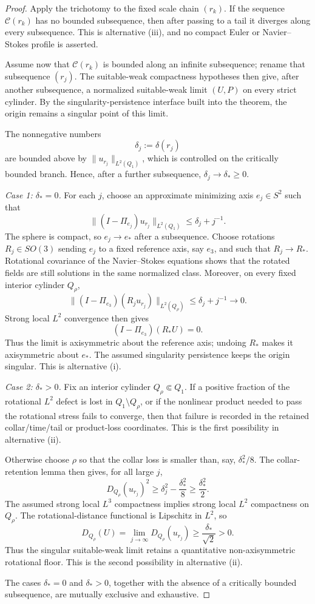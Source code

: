 \documentclass[11pt]{article}
\theoremstyle{definition}\newtheorem{problem}[theorem]{Problem}
\theoremstyle{definition}
\theoremstyle{remark}
\begin{document}
\begin{proof}
Apply the trichotomy to the fixed scale chain \((r_k)\).  If the sequence
\(\mathcal C(r_k)\) has no bounded subsequence, then after passing to a tail it
diverges along every subsequence.  This is alternative (iii), and no compact
Euler or Navier--Stokes profile is asserted.

Assume now that \(\mathcal C(r_k)\) is bounded along an infinite subsequence;
rename that subsequence \((r_j)\).  The suitable-weak compactness hypotheses
then give, after another subsequence, a normalized suitable-weak limit
\((U,P)\) on every strict cylinder.  By the singularity-persistence interface
built into the theorem, the origin remains a singular point of this limit.

The nonnegative numbers
\[
 \delta_j:=\delta(r_j)
\]
are bounded above by \(\|u_{r_j}\|_{L^2(Q_1)}\), which is controlled on the
critically bounded branch.  Hence, after a further subsequence,
\(\delta_j\to\delta_*\ge0\).

\emph{Case 1: \(\delta_*=0\).}
For each \(j\), choose an approximate minimizing axis \(e_j\in S^2\) such that
\[
 \|(I-\Pi_{e_j})u_{r_j}\|_{L^2(Q_1)}
 \le \delta_j+j^{-1}.
\]
The sphere is compact, so \(e_j\to e_*\) after a subsequence.  Choose rotations
\(R_j\in SO(3)\) sending \(e_j\) to a fixed reference axis, say \(e_3\), and
such that \(R_j\to R_*\).  Rotational covariance of the Navier--Stokes
equations shows that the rotated fields are still solutions in the same
normalized class.  Moreover, on every fixed interior cylinder \(Q_\rho\),
\[
 \|(I-\Pi_{e_3})(R_ju_{r_j})\|_{L^2(Q_\rho)}
 \le \delta_j+j^{-1}\to0.
\]
Strong local \(L^2\) convergence then gives
\[
 (I-\Pi_{e_3})(R_*U)=0.
\]
Thus the limit is axisymmetric about the reference axis; undoing \(R_*\) makes
it axisymmetric about \(e_*\).  The assumed singularity persistence keeps the
origin singular.  This is alternative (i).

\emph{Case 2: \(\delta_*>0\).}
Fix an interior cylinder \(Q_\rho\Subset Q_1\).  If a positive fraction of the
rotational \(L^2\) defect is lost in \(Q_1\setminus Q_\rho\), or if the
nonlinear product needed to pass the rotational stress fails to converge,
then that failure is recorded in the retained collar/time/tail or product-loss
coordinates.  This is the first possibility in alternative (ii).

Otherwise choose \(\rho\) so that the collar loss is smaller than, say,
\(\delta_*^2/8\).  The collar-retention lemma then gives, for all large \(j\),
\[
 D_{Q_\rho}(u_{r_j})^2
 \ge \delta_j^2-\frac{\delta_*^2}{8}
 \ge \frac{\delta_*^2}{2}.
\]
The assumed strong local \(L^3\) compactness implies strong local \(L^2\)
compactness on \(Q_\rho\).  The rotational-distance functional is Lipschitz in
\(L^2\), so
\[
 D_{Q_\rho}(U)
 =\lim_{j\to\infty}D_{Q_\rho}(u_{r_j})
 \ge \frac{\delta_*}{\sqrt2}>0.
\]
Thus the singular suitable-weak limit retains a quantitative
non-axisymmetric rotational floor.  This is the second possibility in
alternative (ii).

The cases \(\delta_*=0\) and \(\delta_*>0\), together with the absence of a
critically bounded subsequence, are mutually exclusive and exhaustive.
\end{proof}
\end{document}
